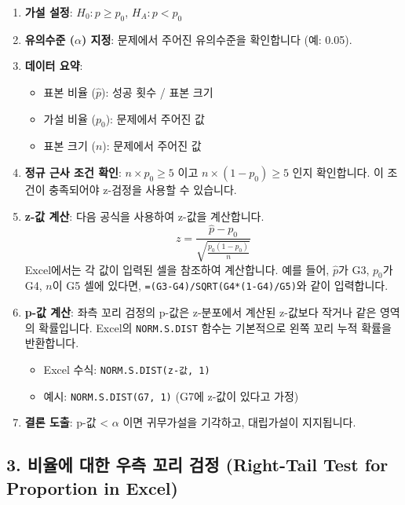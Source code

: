 \documentclass[11pt,a4paper]{book}
\theoremstyle{definition}
\begin{document}
\begin{enumerate}
    \item \textbf{가설 설정}: $H_0: p \ge p_0$, $H_A: p < p_0$
    \item \textbf{유의수준 ($\alpha$) 지정}: 문제에서 주어진 유의수준을 확인합니다 (예: 0.05).
    \item \textbf{데이터 요약}:
    \begin{itemize}
        \item 표본 비율 ($\hat{p}$): 성공 횟수 / 표본 크기
        \item 가설 비율 ($p_0$): 문제에서 주어진 값
        \item 표본 크기 ($n$): 문제에서 주어진 값
    \end{itemize}
    \item \textbf{정규 근사 조건 확인}: $n \times p_0 \ge 5$ 이고 $n \times (1 - p_0) \ge 5$ 인지 확인합니다. 이 조건이 충족되어야 z-검정을 사용할 수 있습니다.
    \item \textbf{z-값 계산}: 다음 공식을 사용하여 z-값을 계산합니다.
    $$z = \frac{\hat{p} - p_0}{\sqrt{\frac{p_0(1-p_0)}{n}}}$$
    Excel에서는 각 값이 입력된 셀을 참조하여 계산합니다. 예를 들어, $\hat{p}$가 G3, $p_0$가 G4, $n$이 G5 셀에 있다면, \texttt{=(G3-G4)/SQRT(G4*(1-G4)/G5)}와 같이 입력합니다.
    \item \textbf{p-값 계산}: 좌측 꼬리 검정의 p-값은 z-분포에서 계산된 z-값보다 작거나 같은 영역의 확률입니다. Excel의 \texttt{NORM.S.DIST} 함수는 기본적으로 왼쪽 꼬리 누적 확률을 반환합니다.
    \begin{itemize}
        \item Excel 수식: \texttt{NORM.S.DIST(z-값, 1)}
        \item 예시: \texttt{NORM.S.DIST(G7, 1)} (G7에 z-값이 있다고 가정)
    \end{itemize}
    \item \textbf{결론 도출}: p-값 < $\alpha$ 이면 귀무가설을 기각하고, 대립가설이 지지됩니다.
\end{enumerate}

\subsection*{3. 비율에 대한 우측 꼬리 검정 (Right-Tail Test for Proportion in Excel)}
\end{document}
